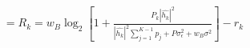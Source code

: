 \documentclass[preview]{standalone}
\begin{document}
\begin{align*}
= R_k = w_B \log_2 \left[1 + \frac{P_k \left|\hat{h_k}\right|^2}{\left|\hat{h_k}\right|^2 \sum_{j=1}^{K-1} {p_j} + P \sigma_{\epsilon}^2 + w_B \sigma^2}\right] - r_k
\end{align*}
\end{document}
